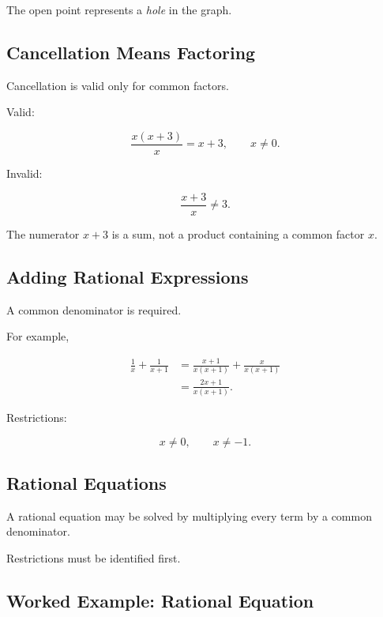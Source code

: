 The open point represents a \emph{hole} in the graph.

\subsection{Cancellation Means Factoring}
\label{subsec:cancellation-factoring}

Cancellation is valid only for common factors.

Valid:

\[ \frac{x(x+3)}{x}=x+3,\qquad x\neq0. \]

Invalid:

\[ \frac{x+3}{x}\neq3. \]

The numerator \(x+3\) is a sum, not a product containing a common factor \(x\).

\subsection{Adding Rational Expressions}
\label{subsec:adding-rational-expressions}

A common denominator is required.

For example,

\[
\begin{aligned}
\frac1x+\frac1{x+1}
&=\frac{x+1}{x(x+1)}+\frac{x}{x(x+1)}\\
&=\frac{2x+1}{x(x+1)}.
\end{aligned}
\]

Restrictions:

\[ x\neq0,\qquad x\neq-1. \]

\subsection{Rational Equations}
\label{subsec:rational-equations}

A rational equation may be solved by multiplying every term by a common
denominator.

Restrictions must be identified first.

\subsection{Worked Example: Rational Equation}
\label{subsec:worked-rational-equation}

